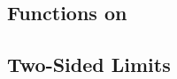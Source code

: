 \documentclass[8pt,landscape]{article}
\begin{document}
\begin{multicols}{3}








    \section{Functions on }

    \subsection{Two-Sided Limits}


\end{multicols}
\end{document}

